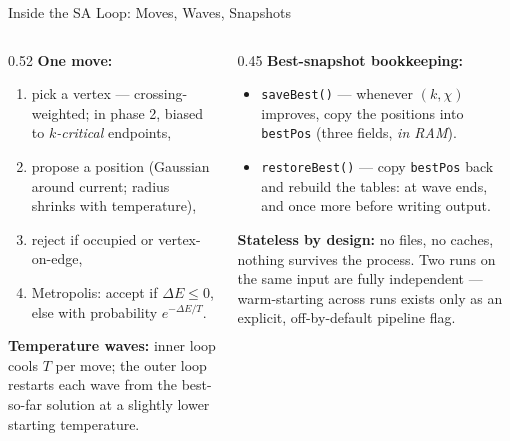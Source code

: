 \begin{frame}{Inside the SA Loop: Moves, Waves, Snapshots}
  \begin{columns}[T]
    \begin{column}{0.52\textwidth}
      \textbf{One move:}
      \begin{enumerate}
        \item pick a vertex --- crossing-weighted; in phase 2, biased to
              \emph{$k$-critical} endpoints,
        \item propose a position (Gaussian around current; radius shrinks
              with temperature),
        \item reject if occupied or vertex-on-edge,
        \item Metropolis: accept if $\Delta E\le 0$, else with
              probability $e^{-\Delta E/T}$.
      \end{enumerate}
      \medskip
      \textbf{Temperature waves:} inner loop cools $T$ per move;
      the outer loop restarts each wave from the best-so-far solution
      at a slightly lower starting temperature.
    \end{column}
    \begin{column}{0.45\textwidth}
      \textbf{Best-snapshot bookkeeping:}
      \begin{itemize}
        \item \texttt{saveBest()} --- whenever $(k,\chi)$ improves, copy the
              positions into \texttt{bestPos} (three fields, \emph{in RAM}).
        \item \texttt{restoreBest()} --- copy \texttt{bestPos} back and rebuild
              the tables: at wave ends, and once more before writing output.
      \end{itemize}
      \medskip
      \textbf{Stateless by design:} no files, no caches, nothing survives the
      process. Two runs on the same input are fully independent ---
      warm-starting across runs exists only as an explicit, off-by-default
      pipeline flag.
    \end{column}
  \end{columns}
\end{frame}

